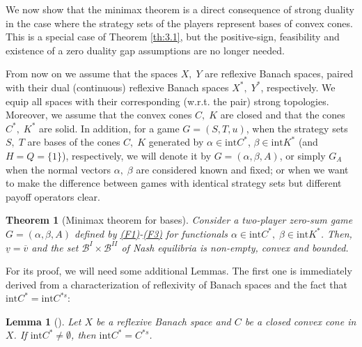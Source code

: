 \documentclass[11pt, twoside]{article}
\numberwithin{equation}{section}
\newtheorem{theorem}{Theorem}[section]
\newtheorem{lemma}{Lemma}[section]
\theoremstyle{definition}
\begin{document}
We now show that the minimax theorem is a direct consequence of strong duality in the case where the strategy sets of the players represent bases of convex cones. This is a special case of Theorem \ref{th:3.1}, but the positive-sign, feasibility and existence of a zero duality gap assumptions are no longer needed.\par
 From now on we assume that the spaces $X,\;Y$ are reflexive Banach spaces, paired with their dual (continuous) reflexive Banach spaces $X^*,\;Y^*$, respectively. We equip all spaces with their corresponding (w.r.t. the pair) strong topologies. Moreover, we assume that the convex cones $C,\;K$ are closed and that the cones $C^*,\;K^*$ are solid. In addition, for a game $G=(S,T,u)$, when the strategy sets $S,\;T$ are bases of the cones $C,\;K$ generated by $\alpha\in \text{int}C^*$, $\beta\in \text{int}K^*$ (and $H=Q=\{1\}$), respectively, we will denote it by $G=(\alpha,\beta,A)$, or simply $G_A$ when the normal vectors $\alpha,\;\beta$ are considered known and fixed; or when we want to make the difference between games with identical strategy sets but different payoff operators clear.


\vspace{0.3cm}\begin{theorem}[Minimax theorem for bases]\label{th:3.3}
    Consider a two-player zero-sum game $G=(\alpha,\beta,A)$ defined by \hyperlink{f1}{(F1)}-\hyperlink{f3}{(F3)} for functionals $\alpha\in \text{int}C^*,\;\beta\in\text{int}K^*$.    Then, $\underline{v}=\overline{v}$ and the set $\mathcal{B}^{I}\times\mathcal{B}^{II}$ of Nash equilibria is non-empty, convex and bounded.
\end{theorem}

 For its proof, we will need some additional Lemmas. The first one is immediately derived from a characterization of reflexivity of Banach spaces and the fact that $\text{int} C^*=\text{int} C^{*s}$:
\begin{lemma}[]\label{lem:3.4}
    Let $X$ be a reflexive Banach space and $C$ be a closed convex cone in $X$. If $\text{int} C^*\neq\emptyset$, then $\text{int} C^*=C^{*s}$.
\end{lemma}
\end{document}
